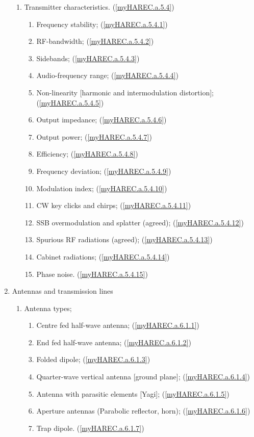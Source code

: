 \begin{enumerate}
\begin{enumerate}
\item Transmitter characteristics. (\ref{myHAREC.a.5.4})\label{HAREC.a.5.4}
\begin{enumerate}
\item Frequency stability; (\ref{myHAREC.a.5.4.1})\label{HAREC.a.5.4.1}
\item RF-bandwidth; (\ref{myHAREC.a.5.4.2})\label{HAREC.a.5.4.2}
\item Sidebands; (\ref{myHAREC.a.5.4.3})\label{HAREC.a.5.4.3}
\item Audio-frequency range; (\ref{myHAREC.a.5.4.4})\label{HAREC.a.5.4.4}
\item Non-linearity [harmonic and intermodulation distortion];
  (\ref{myHAREC.a.5.4.5})\label{HAREC.a.5.4.5}
\item Output impedance; (\ref{myHAREC.a.5.4.6})\label{HAREC.a.5.4.6}
\item Output power; (\ref{myHAREC.a.5.4.7})\label{HAREC.a.5.4.7}
\item Efficiency; (\ref{myHAREC.a.5.4.8})\label{HAREC.a.5.4.8}
\item Frequency deviation; (\ref{myHAREC.a.5.4.9})\label{HAREC.a.5.4.9}
\item Modulation index; (\ref{myHAREC.a.5.4.10})\label{HAREC.a.5.4.10}
\item CW key clicks and chirps; (\ref{myHAREC.a.5.4.11})\label{HAREC.a.5.4.11}
\item SSB overmodulation and splatter (agreed);
  (\ref{myHAREC.a.5.4.12})\label{HAREC.a.5.4.12}
\item Spurious RF radiations (agreed);
  (\ref{myHAREC.a.5.4.13})\label{HAREC.a.5.4.13}
\item Cabinet radiations; (\ref{myHAREC.a.5.4.14})\label{HAREC.a.5.4.14}
\item Phase noise. (\ref{myHAREC.a.5.4.15})\label{HAREC.a.5.4.15}
\end{enumerate}
\end{enumerate}

\item Antennas and transmission lines
\begin{enumerate}

\item Antenna types;
\begin{enumerate}
\item Centre fed half-wave antenna; (\ref{myHAREC.a.6.1.1})\label{HAREC.a.6.1.1}
\item End fed half-wave antenna; (\ref{myHAREC.a.6.1.2})\label{HAREC.a.6.1.2}
\item Folded dipole; (\ref{myHAREC.a.6.1.3})\label{HAREC.a.6.1.3}
\item Quarter-wave vertical antenna [ground plane];
  (\ref{myHAREC.a.6.1.4})\label{HAREC.a.6.1.4}
\item Antenna with parasitic elements [Yagi];
  (\ref{myHAREC.a.6.1.5})\label{HAREC.a.6.1.5}
\item Aperture antennas (Parabolic reflector, horn);
  (\ref{myHAREC.a.6.1.6})\label{HAREC.a.6.1.6}
\item Trap dipole. (\ref{myHAREC.a.6.1.7})\label{HAREC.a.6.1.7}
\end{enumerate}


\end{enumerate}
\end{enumerate}
